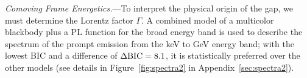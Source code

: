 \documentclass[prd,twocolumn,amsmath,amssymb,aps,linenumbers]{revtex4-2} %
\begin{document}





\textit{Comoving Frame Energetics.}---To interpret the physical origin of the gap, we must determine the Lorentz factor $\Gamma$. A combined model of a multicolor blackbody \citep[mBB, e.g. see][]{2008ApJ...682..463P,2010ApJ...709L.172R,2018ApJ...866...13H} plus a PL function for the broad energy band is used to describe the spectrum of the prompt emission from the keV to GeV energy band; with the lowest BIC and a difference of $\Delta \rm{BIC}=8.1$, it is statistically preferred over the other models (see details in Figure~\ref{fig:spectra2} in Appendix~\ref{sec:spectra2}).
\end{document}
